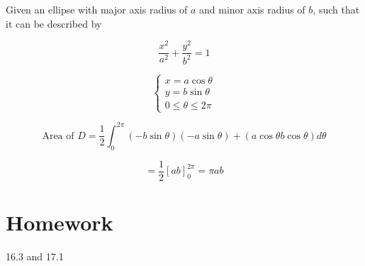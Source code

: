 \documentclass{article}
\begin{document}
Given an ellipse with major axis radius of $a$ and minor axis radius of $b$, such that it can be described by

\[
\dfrac{x^2}{a^2}+\dfrac{y^2}{b^2}=1
\]

\[
\begin{cases}
  x = a \cos{\theta} \\
  y = b \sin{\theta} \\
  0 \le \theta \le 2 \pi
\end{cases}
\]

\[
\text{Area of $D$} = \dfrac{1}{2} \int_0^{2\pi} \left(-b \sin{\theta}\right) \left(-a \sin{\theta}\right) + \left(a \cos{\theta} b \cos{\theta}\right) d\theta
\]

\[
= \dfrac{1}{2} \left[a b \right]_0^{2\pi} = \pi a b
\]

\section*{Homework}

16.3 and 17.1
\end{document}
